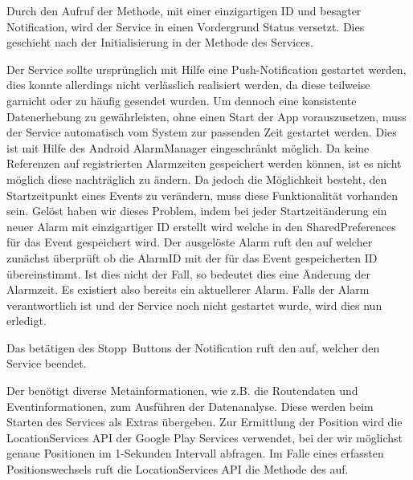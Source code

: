 Durch den Aufruf der  Methode, mit einer einzigartigen ID und besagter Notification, wird der Service in einen Vordergrund Status versetzt. Dies geschieht nach der Initialisierung in der  Methode des Services.

Der Service sollte ursprünglich mit Hilfe eine Push-Notification gestartet werden, dies konnte allerdings nicht verlässlich realisiert werden, da diese teilweise garnicht oder zu häufig gesendet wurden. Um dennoch eine konsistente Datenerhebung zu gewährleisten, ohne einen Start der App vorauszusetzen, muss der Service automatisch vom System zur passenden Zeit gestartet werden. Dies ist mit Hilfe des Android AlarmManager eingeschränkt möglich. Da keine Referenzen auf registrierten Alarmzeiten gespeichert werden können, ist es nicht möglich diese nachträglich zu ändern. Da jedoch die Möglichkeit besteht, den Startzeitpunkt eines Events zu verändern, muss diese Funktionalität vorhanden sein. Gelöst haben wir dieses Problem, indem bei jeder Startzeitänderung ein neuer Alarm mit einzigartiger ID erstellt wird welche in den SharedPreferences für das Event gespeichert wird. Der ausgelöste Alarm ruft den  auf welcher zunächst überprüft ob die AlarmID mit der für das Event gespeicherten ID übereinstimmt. Ist dies nicht der Fall, so bedeutet dies eine Änderung der Alarmzeit. Es existiert also bereits ein aktuellerer Alarm. Falls der Alarm verantwortlich ist und der Service noch nicht gestartet wurde, wird dies nun erledigt.

Das betätigen des \glqq Stopp\grqq\ Buttons der Notification ruft den  auf, welcher den Service beendet.

Der  benötigt diverse Metainformationen, wie z.B. die Routendaten und Eventinformationen, zum Ausführen der Datenanalyse. Diese werden beim Starten des Services als Extras übergeben. Zur Ermittlung der Position wird die LocationServices API der Google Play Services verwendet, bei der wir möglichst genaue Positionen im 1-Sekunden Intervall abfragen. Im Falle eines erfassten Positionswechsels ruft die LocationServices API die  Methode des  auf.

